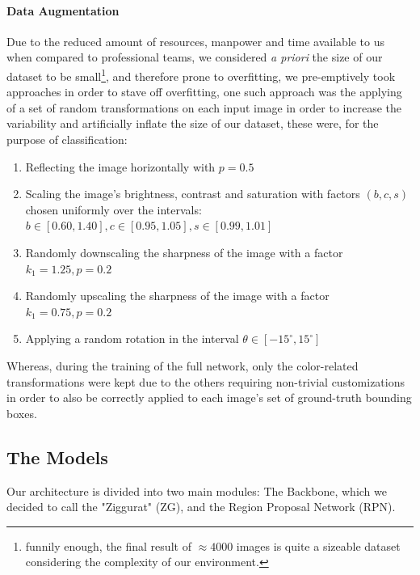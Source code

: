 \documentclass[10pt,journal,cspaper,compsoc]{IEEEtran}
\begin{document}
    \paragraph*{Data Augmentation}
    Due to the reduced amount of resources, manpower and time available to us when compared to professional teams, we considered \emph{a priori} the size of our dataset to be small\footnote{funnily enough, the final result of $\approx4000$ images is quite a sizeable dataset considering the complexity of our environment.}, and therefore 
    prone to overfitting, we pre-emptively took approaches in order to stave off overfitting, one such approach was the applying of a set of random transformations on each input image 
    in order to increase the variability and artificially inflate the size of our dataset, these were, for the purpose of classification:
    \begin{enumerate}
        \item Reflecting the image horizontally with $p = 0.5$
        \item Scaling the image's brightness, contrast and saturation 
        with factors $(b, c, s)$ chosen uniformly over 
        the intervals: $b \in [0.60, 1.40], c \in [0.95, 1.05], s \in [0.99, 1.01]$
        \item Randomly downscaling the sharpness of the image with a factor $k_1 = 1.25, p = 0.2$
        \item Randomly upscaling the sharpness of the image with a factor $k_1 = 0.75, p = 0.2$
        \item Applying a random rotation 
        in the interval $\theta \in [-15^{\circ}, 15^{\circ}]$
    \end{enumerate}
    Whereas, during the training of the full network, only the color-related transformations were kept 
    due to the others requiring non-trivial customizations in order to also be correctly applied to each 
    image's set of ground-truth bounding boxes. 
    
    \subsection{The Models}
    Our architecture is divided into two main modules: The Backbone, which we decided to call the "Ziggurat" (ZG), and the Region Proposal Network (RPN).
\end{document}
